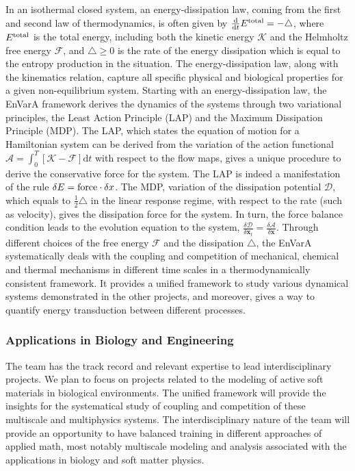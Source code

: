 \documentclass[11pt]{NSFamsart}
\newcommand{\dd}{\mathrm{d}}
\newcommand{\x}{{\bm x}}
\begin{document}
In an isothermal closed system, an energy-dissipation law, coming from the first and second law of thermodynamics, is often given by $\frac{\dd}{\dd t} E^{\rm total} = - \triangle$,
where $E^{\rm total}$ is the total energy, including both the kinetic energy $\mathcal{K}$ and the Helmholtz free energy $\mathcal{F}$, and $\triangle \geq 0$ is the rate of the energy dissipation which is equal to the entropy production in the situation. The energy-dissipation law, along with the kinematics relation, %
capture all specific physical and biological properties for a given non-equilibrium system. Starting with an energy-dissipation law, the EnVarA framework derives the dynamics of the systems through two variational principles, the Least Action Principle (LAP) and the Maximum Dissipation Principle (MDP). The LAP, which states the equation of motion for a Hamiltonian system
can be derived from the variation of the action functional $\mathcal{A} = \int_{0}^T [\mathcal{K} - \mathcal{F}] \dd t$ with respect to the flow maps, gives a unique procedure to derive the conservative force for the system. The LAP is indeed a manifestation of the rule $\delta E = {\rm force} \cdot \delta x$. The MDP, variation of the dissipation potential $\mathcal{D}$, which equals to $\frac{1}{2}\triangle$ in the linear response regime, with respect to the rate (such as velocity), gives the dissipation force for the system. In turn, the force balance condition leads to the evolution equation to the system, $\frac{\delta \mathcal{D}}{\delta \x_t} = \frac{\delta \mathcal{A}}{\delta \x}.$ Through different choices of the free energy $\mathcal{F}$ and the dissipation $\triangle$,
the EnVarA %
systematically deals with the coupling and competition of mechanical, chemical and thermal mechanisms in different time scales in a thermodynamically consistent framework. It 
provides a unified framework to study various
dynamical systems demonstrated in the other projects, and
moreover, gives a way to quantify energy transduction between different processes.  

\subsubsection*{Applications in Biology and Engineering}
The team has the track record and relevant expertise to lead interdisciplinary projects. We plan to focus on projects related to the modeling of active soft materials in biological environments. 
The unified framework will provide the insights for the systematical
study of coupling and competition of these multiscale and multiphysics systems.
The interdisciplinary nature of the team will provide an opportunity to have balanced training in different approaches of applied math, most notably multiscale modeling and analysis associated with the applications in biology and soft matter physics.
\end{document}
